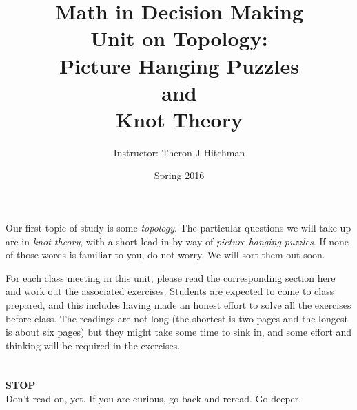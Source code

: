 \documentclass[12pt]{article}
\begin{document}
\title{Math in Decision Making\\ Unit on Topology:\\ 
Picture Hanging Puzzles\\ and\\ Knot Theory}
\author{Instructor: Theron J Hitchman}
\date{Spring 2016}

\maketitle

Our first topic of study is some \emph{topology}. The particular questions we will take up are in \emph{knot theory}, with a short lead-in by way of \emph{picture hanging puzzles}. If none of those words is familiar to you, do not worry. We will sort them out soon.

For each class meeting in this unit, please read the corresponding section here and work out the associated exercises. Students are expected to come to class prepared, and this includes having made an honest effort to solve all the exercises before class. The readings are not long (the shortest is two pages and the longest is about six pages) but they might take some time to sink in, and some effort and thinking will be required in the exercises.

\newpage
$\phantom{Theron J Hitchman}$
\newpage


{\Huge \textbf{STOP}}\\[1in]

Don't read on, yet. If you are curious, go back and reread. Go deeper.
\newpage
$\phantom{Theron J Hitchman}$

\newpage
$\phantom{Theron J Hitchman}$
\newpage

\newpage
$\phantom{Theron J Hitchman}$
\newpage



\newpage
$\phantom{Theron J Hitchman}$
\newpage

\newpage
$\phantom{Theron J Hitchman}$
\newpage

\newpage
$\phantom{Theron J Hitchman}$
\newpage



\end{document}

